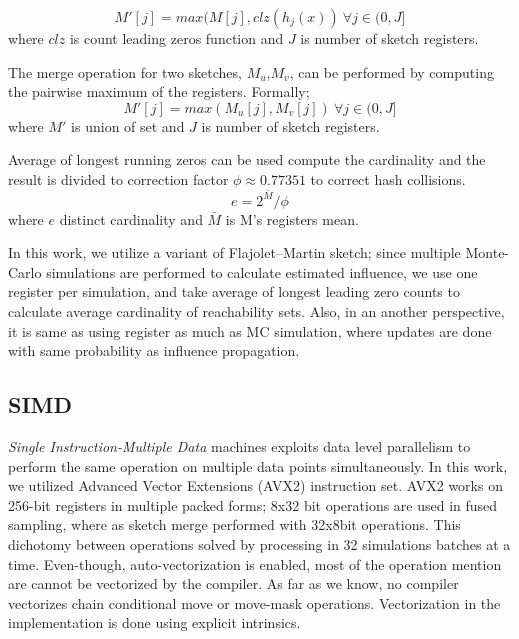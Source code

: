 \documentclass[10pt,journal,compsoc]{IEEEtran}
\begin{document}
\begin{equation}
    \label{eq:sketch-add}
    M'[j] = max(M[j],clz(h_j(x)) ~ \forall j\in(0,J]
\end{equation} where $clz$ is count leading zeros function and $J$ is number of sketch registers.

The merge operation for two sketches, $M_u$,$M_v$, can be performed by computing the pairwise maximum of the registers. Formally; 
\begin{equation}
    \label{eq:sketch-merge}
    M'[j] = max(M_u[j],M_v[j]) ~ \forall j\in(0,J]
\end{equation} 
where $M'$ is union of set and $J$ is number of sketch registers.

Average of longest running zeros can be used compute the cardinality and the result is divided to correction factor $\phi \approx 0.77351$ to correct hash collisions.
\begin{equation}
    \label{eq:sketch-estimate}
    e = 2^{\bar{M}}/\phi
\end{equation} 
where $e$ distinct cardinality and $\bar{M}$ is M's registers mean.

In this work, we utilize a variant of Flajolet–Martin sketch; since multiple Monte-Carlo simulations are performed to calculate estimated influence, we use one register per simulation, and take average of longest leading zero counts to calculate average cardinality of reachability sets. Also, in an another perspective, it is same as using register as much as MC simulation, where updates are done with same probability as influence propagation. 


\subsection{SIMD}
{\em Single Instruction-Multiple Data} machines exploits data level parallelism to perform the same operation on multiple data points simultaneously. In this work, we utilized Advanced Vector Extensions (AVX2) instruction set. AVX2 works on 256-bit registers in multiple packed forms; 8x32 bit operations are used in fused sampling, where as sketch merge  performed with 32x8bit operations. This dichotomy between operations solved by processing in 32 simulations batches at a time.
Even-though, auto-vectorization is enabled, most of the operation mention are cannot be vectorized by the compiler. As far as we know, no compiler vectorizes chain conditional move or move-mask operations. Vectorization in the implementation is done using explicit intrinsics.
\end{document}
